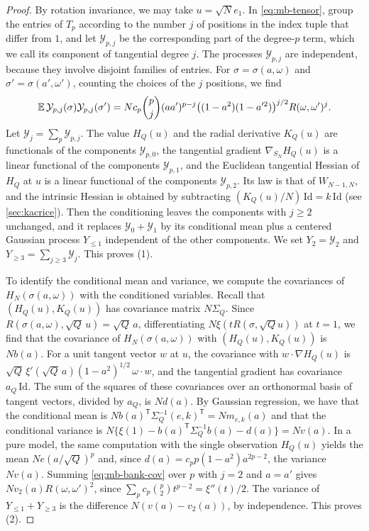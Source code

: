 \begin{proof}
By rotation invariance, we may take $u=\sqrt N e_1$. In \eqref{eq:mb-tensor}, group the entries of $T_p$ according to the number $j$ of positions in the index tuple that differ from $1$, and let $\mathcal Y_{p,j}$ be the corresponding part of the degree-$p$ term, which we call its component of tangential degree $j$. The processes $\mathcal Y_{p,j}$ are independent, because they involve disjoint families of entries. For $\sigma=\sigma(a,\omega)$ and $\sigma'=\sigma(a',\omega')$, counting the choices of the $j$ positions, we find
\begin{equation}\label{eq:mb-bank-cov}
\mathbb E\,\mathcal Y_{p,j}(\sigma)\mathcal Y_{p,j}(\sigma')=Nc_p\binom pj(aa')^{p-j}\bigl((1-a^2)(1-a'^2)\bigr)^{j/2}R(\omega,\omega')^j .
\end{equation}
Let $\mathcal Y_j=\sum_p\mathcal Y_{p,j}$. The value $H_Q(u)$ and the radial derivative $K_Q(u)$ are functionals of the components $\mathcal Y_{p,0}$, the tangential gradient $\nabla_{S_N}H_Q(u)$ is a linear functional of the components $\mathcal Y_{p,1}$, and the Euclidean tangential Hessian of $H_Q$ at $u$ is a linear functional of the components $\mathcal Y_{p,2}$. Its law is that of $W_{N-1,N}$, and the intrinsic Hessian is obtained by subtracting $(K_Q(u)/N)\,\mathrm{Id}=k\,\mathrm{Id}$ (see \cref{sec:kacrice}). Then the conditioning leaves the components with $j\ge2$ unchanged, and it replaces $\mathcal Y_0+\mathcal Y_1$ by its conditional mean plus a centered Gaussian process $Y_{\le1}$ independent of the other components. We set $Y_2=\mathcal Y_2$ and $Y_{\ge3}=\sum_{j\ge3}\mathcal Y_j$. This proves (1).

To identify the conditional mean and variance, we compute the covariances of $H_N(\sigma(a,\omega))$ with the conditioned variables. Recall that $(H_Q(u),K_Q(u))$ has covariance matrix $N\Sigma_Q$. Since $R(\sigma(a,\omega),\sqrt Q\,u)=\sqrt Q\,a$, differentiating $N\xi(tR(\sigma,\sqrt Qu))$ at $t=1$, we find that the covariance of $H_N(\sigma(a,\omega))$ with $(H_Q(u),K_Q(u))$ is $Nb(a)$. For a unit tangent vector $w$ at $u$, the covariance with $w\cdot\nabla H_Q(u)$ is $\sqrt Q\,\xi'(\sqrt Q\,a)(1-a^2)^{1/2}\,\omega\cdot w$, and the tangential gradient has covariance $a_Q\,\mathrm{Id}$. The sum of the squares of these covariances over an orthonormal basis of tangent vectors, divided by $a_Q$, is $Nd(a)$. By Gaussian regression, we have that the conditional mean is $Nb(a)^{\mathsf T}\Sigma_Q^{-1}(e,k)^{\mathsf T}=Nm_{e,k}(a)$ and that the conditional variance is $N\{\xi(1)-b(a)^{\mathsf T}\Sigma_Q^{-1}b(a)-d(a)\}=Nv(a)$. In a pure model, the same computation with the single observation $H_Q(u)$ yields the mean $Ne(a/\sqrt Q)^p$ and, since $d(a)=c_pp(1-a^2)a^{2p-2}$, the variance $Nv(a)$. Summing \eqref{eq:mb-bank-cov} over $p$ with $j=2$ and $a=a'$ gives $Nv_2(a)R(\omega,\omega')^2$, since $\sum_pc_p\binom p2t^{p-2}=\xi''(t)/2$. The variance of $Y_{\le1}+Y_{\ge3}$ is the difference $N(v(a)-v_2(a))$, by independence. This proves (2).


\end{proof}
